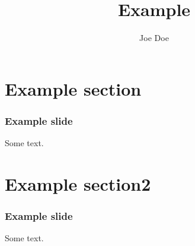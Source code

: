 \documentclass{beamer}
\title{Example}
\author{Joe Doe}
\begin{document}
\section{Example section}

    \begin{frame}
    \frametitle{Example slide}
    Some text.
  \end{frame}

\section{Example section2}

    \begin{frame}
    \frametitle{Example slide}
    Some text.
  \end{frame}
\end{document}
